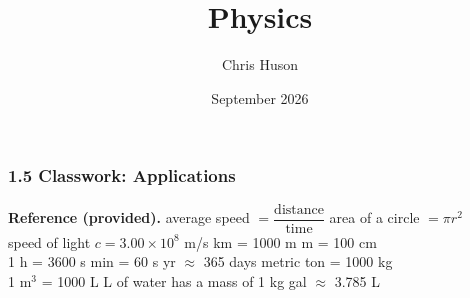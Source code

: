 \documentclass[12pt, twoside]{article}
\title{Physics}
\author{Chris Huson}
\date{September 2026}
\begin{document}
\subsubsection*{1.5 Classwork: Applications}

\textbf{Reference (provided).} \quad
average speed $= \dfrac{\text{distance}}{\text{time}}$ \quad
area of a circle $= \pi r^2$ \\[0.1cm]
speed of light $c = 3.00 \times 10^{8}$ m/s  km = 1000 m  m = 100 cm \\
1 h = 3600 s  min = 60 s  yr $\approx$ 365 days  metric ton = 1000 kg \\
1 m$^3$ = 1000 L  L of water has a mass of 1 kg  gal $\approx$ 3.785 L

\vspace{0.4cm}
\end{document}
